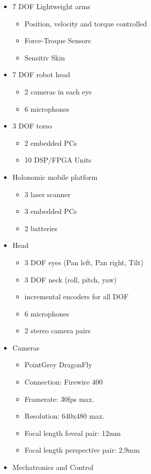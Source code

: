 \begin{itemize}
	\item 7 DOF Lightweight arms
	\begin{itemize}
		\item Position, velocity and torque controlled
		\item Force-Troque Sensors
		\item Sensitiv Skin
	\end{itemize}
	\item 7 DOF robot head
	\begin{itemize}
		\item 2 cameras in each eye
		\item 6 microphones
	\end{itemize}
	\item 3 DOF torso
	\begin{itemize}
		\item 2 embedded PCs
		\item 10 DSP/FPGA Units
	\end{itemize}
	\item Holonomic mobile platform
	\begin{itemize}
		\item 3 laser scanner
		\item 3 embedded PCs
		\item 2 batteries
	\end{itemize}
	\item Head
	\begin{itemize}
		\item 3 DOF eyes (Pan left, Pan right, Tilt)
		\item 3 DOF neck (roll, pitch, yaw)
		\item incremental encoders for all DOF
		\item 6 microphones
		\item 2 stereo camera pairs
	\end{itemize}
	\item Cameras
	\begin{itemize}
		\item PointGrey DragonFly
		\item Connection: Firewire 400
		\item Framerate: 30fps max.
		\item Resolution: 640x480 max.
		\item Focal length foveal pair: 12mm
		\item Focal length perspective pair: 2,9mm
	\end{itemize}
	\item Mechatronics and Control

\end{itemize}

